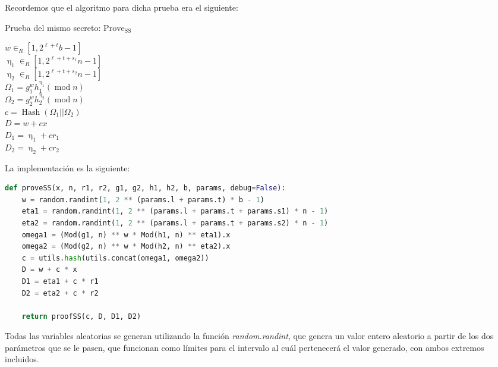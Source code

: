 Recordemos que el algoritmo para dicha prueba era el siguiente: \\
\begin{minipage}{0.9\textwidth}
    \begin{algorithm}[H]
        \caption{Prueba del mismo secreto: $\operatorname{Prove_{SS}}$}

        $w \in_{R} [1, 2^{\ell+t}b-1]$ \\
        $\upeta_{1} \in_{R} [1, 2^{\ell+t+s_{1}}n-1]$ \\
        $\upeta_{2} \in_{R} [1, 2^{\ell+t+s_{2}}n-1]$ \\
        $\Omega_{1} = g_{1}^{w}h_{1}^{\upeta_{1}} (\operatorname{mod} n)$ \\
        $\Omega_{2} = g_{2}^{w}h_{2}^{\upeta_{2}} (\operatorname{mod} n)$ \\
        $c = \operatorname{Hash}(\Omega_{1} || \Omega_{2})$ \\
        $D = w + cx$ \\
        $D_{1} = \upeta_{1} + cr_{1}$ \\
        $D_{2} = \upeta_{2} + cr_{2}$ \\

    \end{algorithm}
\end{minipage}

La implementación es la siguiente:
\begin{lstlisting}[language=Python, basicstyle=\footnotesize]
def proveSS(x, n, r1, r2, g1, g2, h1, h2, b, params, debug=False):
    w = random.randint(1, 2 ** (params.l + params.t) * b - 1)
    eta1 = random.randint(1, 2 ** (params.l + params.t + params.s1) * n - 1)
    eta2 = random.randint(1, 2 ** (params.l + params.t + params.s2) * n - 1)
    omega1 = (Mod(g1, n) ** w * Mod(h1, n) ** eta1).x
    omega2 = (Mod(g2, n) ** w * Mod(h2, n) ** eta2).x
    c = utils.hash(utils.concat(omega1, omega2))
    D = w + c * x
    D1 = eta1 + c * r1
    D2 = eta2 + c * r2

    return proofSS(c, D, D1, D2)
\end{lstlisting}

Todas las variables aleatorias se generan utilizando la función \textit{random.randint}, que genera un valor entero aleatorio a partir de los dos parámetros que se le pasen, que funcionan como límites para el intervalo al cuál pertenecerá el valor generado, con ambos extremos incluidos.

